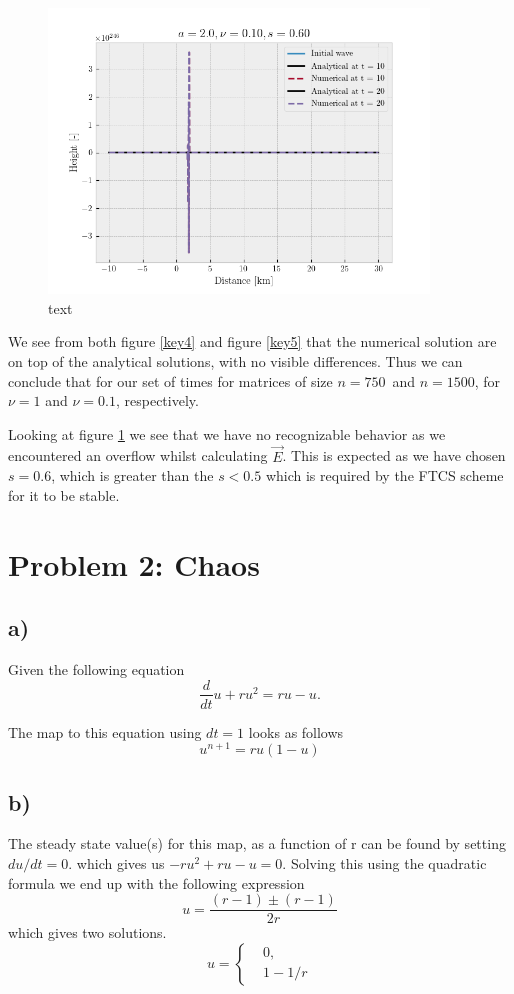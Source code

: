 \documentclass[10pt, a4paper]{amsart}
\begin{document}
\begin{figure}
	\centering
	\includegraphics[width=0.9\textwidth]{../code/fig3.png}
	\caption{text}
	\label{key6}
\end{figure}

We see from both figure \ref{key4} and figure \ref{key5} that the numerical solution are on top of the analytical solutions, with no visible differences. Thus we can conclude that for our set of times for matrices of size $n = 750$ and $n=1500$, for $\nu = 1$ and $\nu=0.1$, respectively. 

Looking at figure \ref{key6} we see that we have no recognizable behavior as we encountered an overflow whilst calculating $\vec{E}$. This is expected as we have chosen $s = 0.6$, which is greater than the $s < 0.5$ which is required by the FTCS scheme for it to be stable. 
\section{Problem 2: Chaos}
\subsection{a)}
Given the following equation 
\begin{equation}
	\frac{d}{dt}u + ru^2 = ru - u.
\end{equation}

The map to this equation using $dt = 1$ looks as follows
\begin{equation}
u^{n+1} = ru(1-u)
\end{equation}

\subsection{b)}
The steady state value(s) for this map, as a function of r can be found by setting $du/dt =0$. which gives us $-ru^2 + ru - u= 0$. Solving this using the quadratic formula we end up with the following expression
\begin{equation}
u = \frac{(r-1)\pm (r-1)}{2r}
\end{equation}
which gives two solutions. 
\begin{equation}
	u = \left\lbrace\begin{split}
			&0,\\
			&1-1/r 
	\end{split} \right.
\end{equation}
\end{document}
